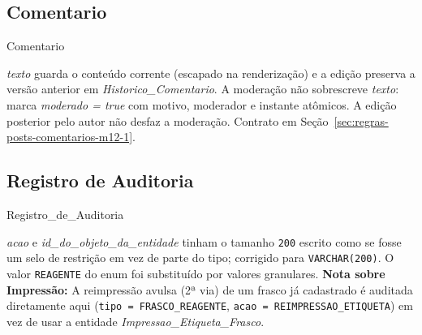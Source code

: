 \subsection{Comentario}
\begin{entidade}{Comentario}
\end{entidade}
\begin{explicacao}
\textit{texto} guarda o conteúdo corrente (escapado na renderização) e a
edição preserva a versão anterior em \textit{Historico\_Comentario}. A
moderação não sobrescreve \textit{texto}: marca \textit{moderado = true} com
motivo, moderador e instante atômicos. A edição posterior pelo autor não desfaz
a moderação. Contrato em
Seção~\ref{sec:regras-posts-comentarios-m12-1}.
\end{explicacao}

\subsection{Registro de Auditoria}
\begin{entidade}{Registro\_de\_Auditoria}
\end{entidade}

\begin{explicacao}
\textit{acao} e \textit{id\_do\_objeto\_da\_entidade} tinham o tamanho \texttt{200} escrito como se fosse um selo de restrição em vez de parte do tipo; corrigido para \texttt{VARCHAR(200)}. O valor \texttt{REAGENTE} do enum foi substituído por valores granulares.
\textbf{Nota sobre Impressão:} A reimpressão avulsa (2ª via) de um frasco já cadastrado é auditada diretamente aqui (\texttt{tipo = FRASCO\_REAGENTE}, \texttt{acao = REIMPRESSAO\_ETIQUETA}) em vez de usar a entidade \textit{Impressao\_Etiqueta\_Frasco}.
\end{explicacao}
\newpage

